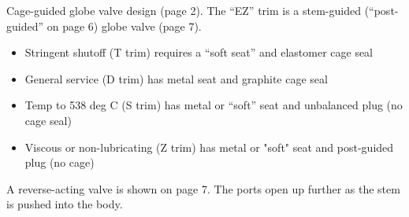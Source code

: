 Cage-guided globe valve design (page 2).  The ``EZ'' trim is a stem-guided (``post-guided'' on page 6) globe valve (page 7).

\vskip 10pt

\begin{itemize}
\item{} Stringent shutoff (T trim) requires a ``soft seat'' and elastomer cage seal
\item{} General service (D trim) has metal seat and graphite cage seal
\item{} Temp to 538 deg C (S trim) has metal or ``soft'' seat and unbalanced plug (no cage seal)
\item{} Viscous or non-lubricating (Z trim) has metal or "soft" seat and post-guided plug (no cage)
\end{itemize}

\vskip 10pt

A reverse-acting valve is shown on page 7.  The ports open up further as the stem is pushed into the body.








